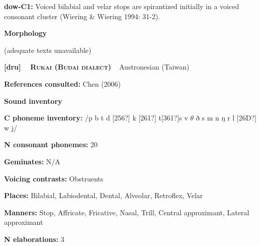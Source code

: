 \begin{styleBody}
\textbf{dow-C1: }Voiced bilabial and velar stops are spirantized initially in a voiced consonant cluster (Wiering \& Wiering 1994: 31-2).
\end{styleBody}

\begin{styleBody}
\textbf{Morphology}
\end{styleBody}

\begin{styleBody}
(adequate texts unavailable)
\end{styleBody}

\clearpage\begin{styleBody}
\textbf{[dru] }\ \ \textbf{\textsc{Rukai (Budai dialect)\ \ }}Austronesian (Taiwan)
\end{styleBody}

\begin{styleBody}
\textbf{References consulted: }Chen (2006)
\end{styleBody}

\begin{styleBody}
\textbf{Sound inventory}
\end{styleBody}

\begin{styleBody}
\textbf{C phoneme inventory:} /p b t d [256?] k [261?] t[361?]s v $\theta $ ð s m n ŋ r l [26D?] w j/
\end{styleBody}

\begin{styleBody}
\textbf{N consonant phonemes:} 20
\end{styleBody}

\begin{styleBody}
\textbf{Geminates:} N/A
\end{styleBody}

\begin{styleBody}
\textbf{Voicing contrasts:} Obstruents
\end{styleBody}

\begin{styleBody}
\textbf{Places:} Bilabial, Labiodental, Dental, Alveolar, Retroflex, Velar
\end{styleBody}

\begin{styleBody}
\textbf{Manners:} Stop, Affricate, Fricative, Nasal, Trill, Central approximant, Lateral approximant
\end{styleBody}

\begin{styleBody}
\textbf{N elaborations:} 3
\end{styleBody}

